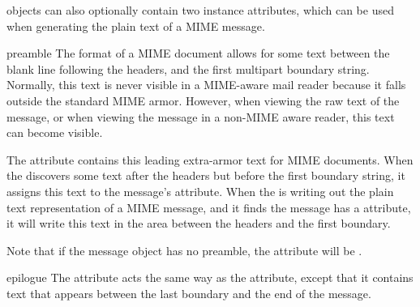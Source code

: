  objects can also optionally contain two instance
attributes, which can be used when generating the plain text of a MIME
message.

\begin{datadesc}{preamble}
The format of a MIME document allows for some text between the blank
line following the headers, and the first multipart boundary string.
Normally, this text is never visible in a MIME-aware mail reader
because it falls outside the standard MIME armor.  However, when
viewing the raw text of the message, or when viewing the message in a
non-MIME aware reader, this text can become visible.

The  attribute contains this leading extra-armor text
for MIME documents.  When the  discovers some text after
the headers but before the first boundary string, it assigns this text
to the message's  attribute.  When the 
is writing out the plain text representation of a MIME message, and it
finds the message has a  attribute, it will write this
text in the area between the headers and the first boundary.

Note that if the message object has no preamble, the
 attribute will be .
\end{datadesc}

\begin{datadesc}{epilogue}
The  attribute acts the same way as the 
attribute, except that it contains text that appears between the last
boundary and the end of the message.
\end{datadesc}
